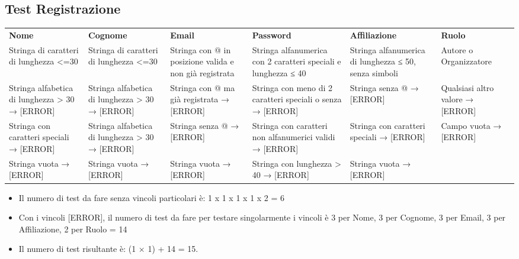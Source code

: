 \subsection{Test Registrazione}
\label{sec:test_registrazione}

\begin{sidewaystable}
\begin{tabular}{|p{3.5cm}|p{2cm}|p{2cm}|p{3cm}|p{2cm}|p{2cm}|}
\hline
\rowcolor{SkyBlue}
\multicolumn{6}{l}{\textbf{REGISTRAZIONE}}\\
\hline
\rowcolor{Red}
\textbf{Nome} & \textbf{Cognome} & \textbf{Email} & \textbf{Password} & \textbf{Affiliazione} & \textbf{Ruolo}  \\
\hline
Stringa di caratteri di lunghezza <=30 & Stringa di caratteri di lunghezza <=30 & Stringa con @ in posizione valida e non già registrata & Stringa alfanumerica con 2 caratteri speciali e lunghezza ≤ 40 & Stringa alfanumerica di lunghezza ≤ 50, senza simboli & Autore o Organizzatore \\
\hline
Stringa alfabetica di lunghezza > 30 → [ERROR] & Stringa alfabetica di lunghezza > 30 → [ERROR] & Stringa con @ ma già registrata → [ERROR] & Stringa con meno di 2 caratteri speciali o senza → [ERROR] & Stringa senza @ → [ERROR] & Qualsiasi altro valore → [ERROR] \\
\hline
Stringa con caratteri speciali → [ERROR] & Stringa alfabetica di lunghezza > 30 → [ERROR] & Stringa senza @ → [ERROR] & Stringa con caratteri non alfanumerici validi → [ERROR] & Stringa con caratteri speciali → [ERROR] & Campo vuota → [ERROR]  \\
\hline
Stringa vuota → [ERROR] & Stringa vuota → [ERROR] & Stringa vuota → [ERROR] & Stringa con lunghezza > 40 → [ERROR] & Stringa vuota → [ERROR] &\\
\hline
\end{tabular}
\end{sidewaystable}

\begin{itemize}
\item Il numero di test da fare senza vincoli particolari è: 1 x 1 x 1 x 1 x 2 = 6
\item Con i vincoli [ERROR], il numero di test da fare per testare singolarmente i vincoli è 3 per Nome, 3 per Cognome, 3 per Email, 3 per Affiliazione, 2 per Ruolo = 14 
\item Il numero di test risultante è: (1 × 1) + 14 = 15.
\end{itemize}

